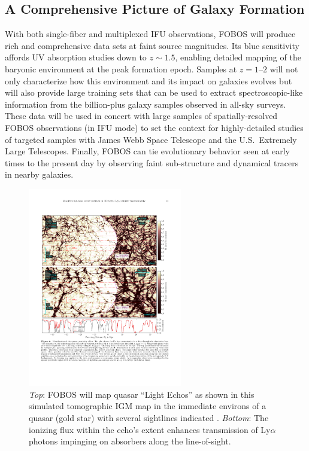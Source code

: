 
\subsection{A Comprehensive Picture of Galaxy Formation}

With both single-fiber and multiplexed IFU observations, FOBOS will produce rich and comprehensive data sets at faint source magnitudes.  Its blue sensitivity affords UV absorption studies down to $z \sim 1.5$, enabling detailed mapping of the baryonic environment at the peak formation epoch.  Samples at $z=1$--$2$ will not only characterize how this environment and its impact on galaxies evolves but will also provide large training sets that can be used to extract spectroscopic-like information from the billion-plus galaxy samples observed in all-sky surveys.  These data will be used in concert with large samples of spatially-resolved FOBOS observations (in IFU mode) to set the context for highly-detailed studies of targeted samples with James Webb Space Telescope and the U.S.~Extremely Large Telescopes.  Finally, FOBOS can tie evolutionary behavior seen at early times to the present day by observing faint sub-structure and dynamical tracers in nearby galaxies.

\begin{figure}
%
\includegraphics[width=0.6\textwidth]{figs/qso_LightEcho_v1.pdf}
%
\caption{{\it Top}: FOBOS will map quasar ``Light Echos'' as shown in this simulated
tomographic IGM map in the immediate environs of a quasar (gold star)
with several sightlines indicated
\citep[from][]{2018arXiv181005156S}. {\it Bottom}: The ionizing flux
within the echo's extent enhances transmission of Ly$\alpha$ photons
impinging on absorbers along the line-of-sight.}
\label{fig:LightEcho}
\end{figure}

